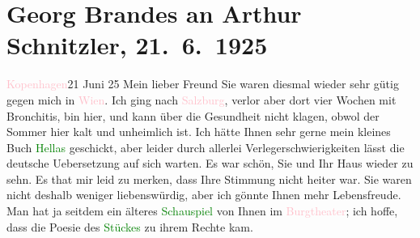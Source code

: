 

               \section[Georg Brandes an Arthur Schnitzler, 21. 6. 1925]{ Georg Brandes an Arthur Schnitzler, 21. 6. 1925}\nopagebreak{}\rehead{ }\normalsize\beginnumbering{} \toendnotes[C]{\smallbreak\pagebreak[2]} 
\toendnotes[C]{\smallbreak}\pstart
           \raggedleft{}{\pb}\textcolor{pink}{Kopenhagen}{}\ledrightnote{\textcolor{pink}{Kopenhagen}}{ }21 Juni 25\pend
           \pstart{}Mein lieber Freund\pend\pstart
           Sie waren diesmal wieder sehr gütig gegen mich in \textcolor{pink}{Wien}{}\ledrightnote{\textcolor{pink}{Wien}}. Ich ging nach \textcolor{pink}{Salzburg}{}\ledrightnote{\textcolor{pink}{Salzburg}}, verlor
                    aber dort vier Wochen mit Bronchitis, bin hier, und kann über die Gesundheit
                    nicht klagen, obwol der Sommer hier kalt und unheimlich ist.\pend
           \pstart
           Ich hätte Ihnen sehr gerne mein kleines Buch \textcolor{green}{Hellas}{}\ledrightnote{\textcolor{green}{Hellas}} geschickt, aber leider durch allerlei Verlegerschwierigkeiten
                    lässt die deutsche Uebersetzung auf sich warten.\pend
           \pstart
           Es war schön, Sie und Ihr Haus wieder zu sehn. Es that mir leid zu merken, dass
                    Ihre Stimmung nicht heiter war. Sie waren nicht deshalb weniger liebenswürdig,
                    aber ich gönnte {\pb}Ihnen mehr
                    Lebensfreude.\pend
           \pstart
           Man hat ja seitdem ein älteres \textcolor{green}{Schauspiel}{} von Ihnen im \textcolor{pink}{Burgtheater}{}\ledrightnote{\textcolor{pink}{Burgtheater}}\label{K_L02443_1v}\label{K_L02443_1h}; ich hoffe, dass die Poesie des \textcolor{green}{Stückes}{} zu ihrem Rechte kam.
